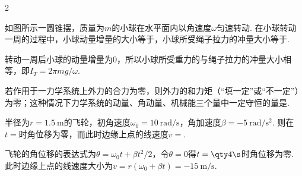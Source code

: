 \begin{paracol}{2}
\begin{problem}
    如图所示一圆锥摆，质量为$m$的小球在水平面内以角速度$\omega$匀速转动. 在小球转动一周的过程中，小球动量增量的大小等于，小球所受绳子拉力的冲量大小等于.
    \switchcolumn\vspace*{\fill}\centering
    \vspace*{\fill}
\end{problem}
\switchcolumn
{}
\begin{solution}
    转动一周后小球的动量增量为$0$，所以小球所受重力的与绳子拉力的冲量大小相等，即$I_T=2\pi mg/\omega$.
\end{solution}
\end{paracol}

\begin{problem}
若作用于一力学系统上外力的合力为零，则外力的和力矩（``填一定''或``不一定''）为零；这种情况下力学系统的动量、角动量、机械能三个量中一定守恒的量是.
\end{problem}

\begin{problem}
半径为$r=\qty{1.5}\m$的飞轮，初角速度$\omega_0=\qty{10}{\radian/\s}$，角加速度$\beta=\qty{-5}{\radian/\s^2}$. 则在$t=$时角位移为零，而此时边缘上点的线速度$v=$.
\end{problem}
\begin{solution}
    飞轮的角位移的表达式为$\theta=\omega_0 t+\beta t^2/2$，令$\theta=0$得$t=\qty4\s$时角位移为零. 此时边缘上点的线速度大小为$v=r(\omega_0+\beta t)=\qty{-15}{\m/\s}$.
\end{solution}

